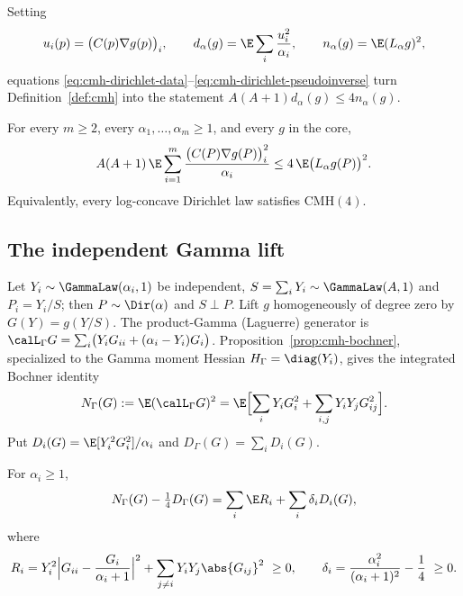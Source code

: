 \documentclass[../../main.tex]{subfiles}
\begin{document}
Setting
\begin{equation}
  u_i(p)=\bigl(C(p)\nabla g(p)\bigr)_i,
  \qquad
  d_\alpha(g)=\E\sum_i\frac{u_i^2}{\alpha_i},
  \qquad
  n_\alpha(g)=\E(L_\alpha g)^2,
  \label{eq:cmh-dirichlet-dn}
\end{equation}
equations \eqref{eq:cmh-dirichlet-data}--\eqref{eq:cmh-dirichlet-pseudoinverse} turn
Definition~\ref{def:cmh} into the statement $A(A+1)d_\alpha(g)\le4n_\alpha(g)$.

\begin{theorem}
\label{thm:cmh-dirichlet}
For every $m\ge2$, every $\alpha_1,\dots,\alpha_m\ge1$, and every $g$ in the core,
\begin{equation}
  A(A+1)\,\E\sum_{i=1}^m
  \frac{\bigl(C(P)\nabla g(P)\bigr)_i^2}{\alpha_i}
  \le4\,\E\bigl(L_\alpha g(P)\bigr)^2.
  \label{eq:cmh-dirichlet-main}
\end{equation}
Equivalently, every log-concave Dirichlet law satisfies $\mathrm{CMH}(4)$.
\end{theorem}

\subsection{The independent Gamma lift}
\label{subsec:cmh-gamma-lift}

Let $Y_i\sim\GammaLaw(\alpha_i,1)$ be independent, $S=\sum_iY_i\sim\GammaLaw(A,1)$ and
$P_i=Y_i/S$; then $P\sim\Dir(\alpha)$ and $S\perp P$. Lift $g$ homogeneously of degree zero by
$G(Y)=g(Y/S)$. The product-Gamma (Laguerre) generator is
$\calL_\Gamma G=\sum_i\bigl(Y_iG_{ii}+(\alpha_i-Y_i)G_i\bigr)$.
Proposition~\ref{prop:cmh-bochner}, specialized to the Gamma moment Hessian
$H_\Gamma=\diag(Y_i)$, gives the integrated Bochner identity
\begin{equation}
  N_\Gamma(G):=\E(\calL_\Gamma G)^2
  =\E\Bigl[\sum_iY_iG_i^2+\sum_{i,j}Y_iY_jG_{ij}^2\Bigr].
  \label{eq:cmh-gamma-bochner}
\end{equation}
Put $D_i(G)=\E[Y_i^2G_i^2]/\alpha_i$ and $D_\Gamma(G)=\sum_iD_i(G)$.

\begin{lemma}
\label{lem:cmh-gamma-completion}
For $\alpha_i\ge1$,
\begin{equation}
  N_\Gamma(G)-\tfrac14D_\Gamma(G)=\sum_i\E R_i+\sum_i\delta_iD_i(G),
  \label{eq:cmh-gamma-completion}
\end{equation}
where
\begin{equation}
  R_i=Y_i^2\Bigl\lvert G_{ii}-\frac{G_i}{\alpha_i+1}\Bigr\rvert^2
      +\sum_{j\ne i}Y_iY_j\abs{G_{ij}}^2\ \ge0,
  \qquad
  \delta_i=\frac{\alpha_i^2}{(\alpha_i+1)^2}-\frac14\ \ge0.
  \label{eq:cmh-Ri-deltai}
\end{equation}
\end{lemma}
\end{document}
